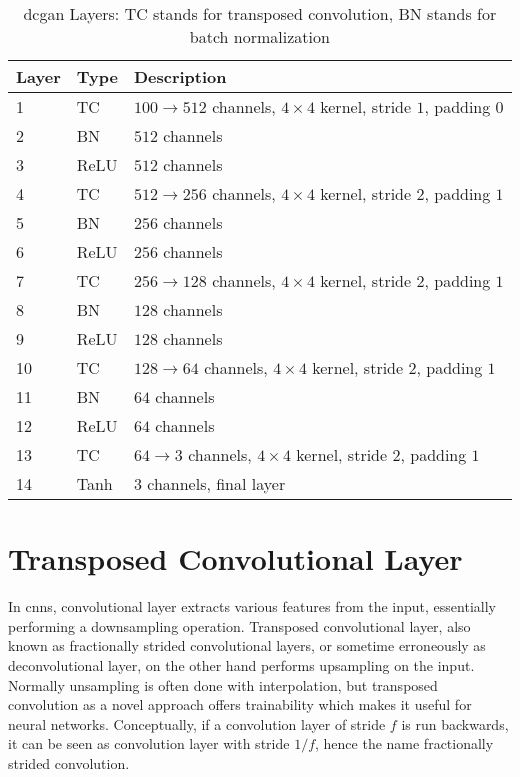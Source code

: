 \begin{table}[h]
  \centering
  \caption{\gls{dcgan} Layers: TC stands for transposed convolution, BN stands for batch normalization}
  \begin{tabular}{l | l | l }
    \toprule
    Layer & Type & Description \\
    \midrule
    1 & TC & $100 \rightarrow 512$ channels, $4 \times 4$ kernel, stride $1$, padding $0$ \\
    2 & BN & $512$ channels\\
    3 & ReLU & $512$ channels \\
    4 & TC & $512 \rightarrow 256$ channels, $4 \times 4$ kernel, stride $2$, padding $1$ \\
    5 & BN & $256$ channels \\
    6 & ReLU & $256$ channels \\
    7 & TC & $256 \rightarrow 128$ channels, $4 \times 4$ kernel, stride $2$, padding $1$ \\
    8 & BN & $128$ channels \\
    9 & ReLU & $128$ channels \\
    10 & TC & $128 \rightarrow 64$ channels, $4 \times 4$ kernel, stride $2$, padding $1$ \\
    11 & BN & $64$ channels \\
    12 & ReLU & $64$ channels \\
    13 & TC & $64 \rightarrow 3$ channels, $4 \times 4$ kernel, stride $2$, padding $1$ \\
    14 & Tanh & 3 channels, final layer \\
    \bottomrule
  \end{tabular}
  \label{table:network_layers}
\end{table}

\section{Transposed Convolutional Layer}

In \gls{cnn}s, convolutional layer extracts various features from the input, essentially performing a
downsampling operation. Transposed convolutional layer, also known as fractionally strided convolutional
layers, or sometime erroneously as deconvolutional layer, on the other hand performs upsampling on the input.
Normally unsampling is often done with interpolation, but transposed convolution as a novel approach offers
trainability which makes it useful for neural networks. Conceptually, if a convolution layer of stride $f$
is run backwards, it can be seen as convolution layer with stride $1/f$, hence the name fractionally
strided convolution.

